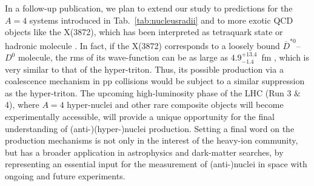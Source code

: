 In a follow-up publication, we plan to extend our study to predictions for the $A=4$ systems introduced in Tab.~\ref{tab:nucleusradii} and to more exotic QCD objects like the X(3872), which has been interpreted as tetraquark state or hadronic molecule \cite{Esposito:2015fsa, Cho:2017dcy}. 
In fact, if the X(3872) corresponds to a loosely bound $\overline{D}^{*0}$--$D^{0}$ molecule, the rms of its wave-function can be as large as $4.9^{+13.4}_{-1.4}$~fm \cite{Artoisenet:2010uu}, which is very similar to that of the hyper-triton. Thus, its possible production via a coalescence mechanism in pp collisions would be subject to a similar suppression as the hyper-triton. 
The upcoming high-luminosity phase of the LHC (Run 3 $\&$ 4), where $A = 4$ hyper-nuclei and other rare composite objects will become experimentally accessible, will provide a unique opportunity for the final understanding of (anti-)(hyper-)nuclei production.
Setting a final word on the production mechanisms is not only in the interest of the heavy-ion community, but has a broader application in astrophysics and dark-matter searches, by representing an essential input for the measurement of (anti-)nuclei in space with ongoing \cite{Alcaraz:2000ss, Poulin:2018wzu} and future \cite{AMS100, Aramaki:2015laa} experiments. 



